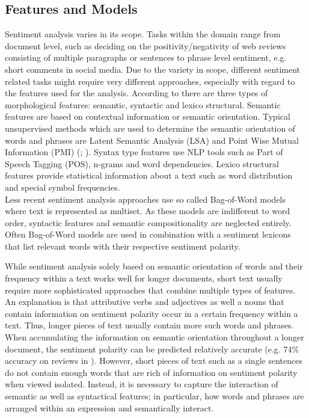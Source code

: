 \documentclass[a4paper,12pt]{article}%
\begin{document}
\subsection{Features and Models}

Sentiment analysis varies in its scope. Tasks within the domain range from document level, such as deciding on the positivity/negativity of web reviews consisting of multiple paragraphs or sentences to phrase level sentiment, e.g. short comments in social media. Due to the variety in scope, different sentiment related tasks might require very different approaches, especially with regard to the features used for the analysis. According to \citet{Asghar2014} there are three types of morphological features: semantic,  syntactic and lexico structural. Semantic features are based on contextual information or semantic orientation. Typical unsupervised methods which are used to determine the semantic orientation of words and phrases are Latent Semantic Analysis (LSA) and Point Wise Mutual Information (PMI) (\cite{Turney2002}; \cite{Turney2003}). Syntax type features use NLP tools such as Part of Speech Tagging (POS), n-grams and word dependencies. Lexico structural features provide statistical information about a text such as word distribution and special symbol frequencies.\\


Less recent sentiment analysis approaches use so called Bag-of-Word models where text is represented as multiset. As these models are indifferent to word order, syntactic features and semantic compositionality are neglected entirely. Often Bag-of-Word models are used in combination with a sentiment lexicons that list relevant words with their respective sentiment polarity.

While sentiment analysis solely based on semantic orientation of words and their frequency within a text works well for longer documents, short text usually require more sophisticated approaches that combine multiple types of features. An explanation is that attributive verbs and adjectives as well a nouns that contain information on sentiment polarity occur in a certain frequency within a text. Thus, longer pieces of text usually contain more such words and phrases. When accumulating the information on semantic orientation throughout a longer document, the sentiment polarity can be predicted relatively accurate (e.g. 74\% accuracy on reviews in \citet{Turney2002}). However, short pieces of text such as a single sentences do not contain enough words that are rich of information on sentiment polarity when viewed isolated. Instead, it is necessary to capture the interaction of semantic as well as syntactical features; in particular, how words and phrases are arranged within an expression and semantically interact.\\
\end{document}
